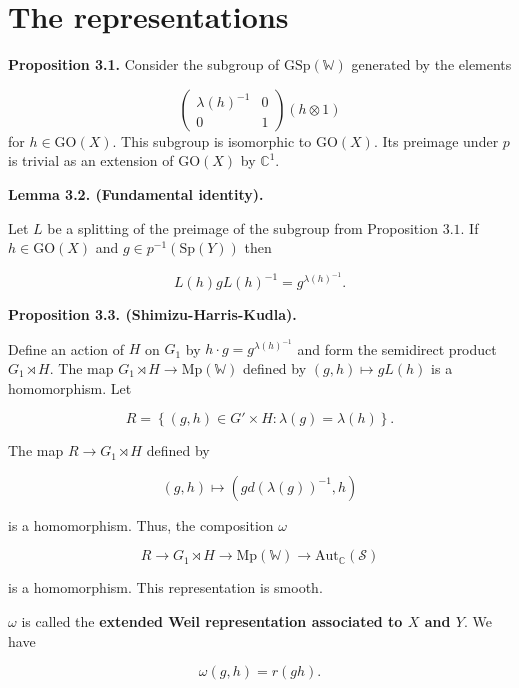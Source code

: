 \documentclass[12pt]{article}
\begin{document}
\section{The representations}

\textbf{Proposition 3.1.} Consider the subgroup of
$\text{GSp}\left(\mathbb{W}\right)$ generated by the elements 

\[\begin{pmatrix} \lambda\left(h\right)^{-1} & 0 \\ 0 & 1 \end{pmatrix} \left(h
\otimes 1\right)\] for $h \in \text{GO}\left(X\right)$. This subgroup is
isomorphic to $\text{GO}\left(X\right)$. Its preimage under $p$ is trivial as an
extension of $\text{GO}\left(X\right)$ by $\mathbb{C}^{1}$.

\textbf{Lemma 3.2. (Fundamental identity).} 

Let $L$ be a splitting of the preimage of the subgroup from Proposition $3.1$.
If $h \in \text{GO}\left(X\right)$ and $g \in
p^{-1}\left(\text{Sp}\left(Y\right)\right)$ then 

\[L\left(h\right)gL\left(h\right)^{-1} = g^{\lambda\left(h\right)^{-1}}.\]

\textbf{Proposition 3.3. (Shimizu-Harris-Kudla).} 

Define an action of $H$ on $G_1$ by $h \cdot g = g^{\lambda\left(h\right)^{-1}}$
and form the semidirect product $G_1 \rtimes H$. The map $G_{1} \rtimes H
\rightarrow \text{Mp}\left(\mathbb{W}\right)$ defined by $\left(g, h\right)
\mapsto g L\left(h\right)$ is a homomorphism. Let 

\[R = \left\{\left(g, h\right) \in G' \times H : \lambda\left(g\right) =
\lambda\left(h\right)\right\}.\]

The map $R \rightarrow G_{1} \rtimes H$ defined by 

\[\left(g, h\right) \mapsto \left(gd\left(\lambda\left(g\right)\right)^{-1}, h\right)\]

is a homomorphism. Thus, the composition $\omega$ 

\[R \rightarrow G_{1} \rtimes H \rightarrow \text{Mp}\left(\mathbb{W}\right)
\rightarrow \text{Aut}_{\mathbb{C}}\left(\mathcal{S}\right)\]

is a homomorphism. This representation is smooth.

$\omega$ is called the \textbf{extended Weil representation associated to $X$ and
$Y$}. We have 

\[\omega\left(g, h\right) = r\left(gh\right).\]
\end{document}
